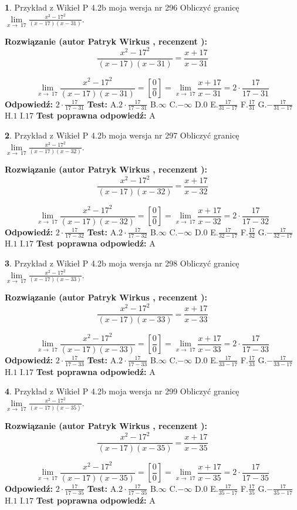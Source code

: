 \documentclass[12pt, a4paper]{article}
\theoremstyle{definition} %
\newtheorem{zad}{}
\newcommand{\zadStart}[1]{\begin{zad}#1\newline}
\newcommand{\zadStop}{\end{zad}}
\newcommand{\rozwStart}[2]{\noindent \textbf{Rozwiązanie (autor #1 , recenzent #2): }\newline}
\newcommand{\rozwStop}{\newline}
\newcommand{\odpStart}{\noindent \textbf{Odpowiedź:}\newline}
\newcommand{\odpStop}{\newline}
\newcommand{\testStart}{\noindent \textbf{Test:}\newline}
\newcommand{\testStop}{\newline}
\newcommand{\kluczStart}{\noindent \textbf{Test poprawna odpowiedź:}\newline}
\newcommand{\kluczStop}{\newline}
\begin{document}
\zadStart{Przykład z Wikieł P 4.2b moja wersja nr 296}
Obliczyć granicę $\lim\limits_{x\to\ 17}\frac{x^{2}-17^{2}}{(x-17)(x-31)}$.
\zadStop
\rozwStart{Patryk Wirkus}{}
$$\frac{x^{2}-17^{2}}{(x-17)(x-31)}=\frac{x+17}{x-31}$$

$$\lim\limits_{x\to\ 17}\frac{x^{2}-17^{2}}{(x-17)(x-31)}=[\frac{0}{0}]=\lim\limits_{x\to\ 17}\frac{x+17}{x-31}=2 \cdot \frac{17}{17-31}$$
\rozwStop
\odpStart
$2 \cdot \frac{17}{17-31}$
\odpStop
\testStart
A.$2 \cdot \frac{17}{17-31}$
B.$\infty$
C.$-\infty$
D.$0$
E.$\frac{17}{31-17}$
F.$\frac{17}{31}$
G.$-\frac{17}{31-17}$
H.$1$
I.$17$
\testStop
\kluczStart
A
\kluczStop



\zadStart{Przykład z Wikieł P 4.2b moja wersja nr 297}
Obliczyć granicę $\lim\limits_{x\to\ 17}\frac{x^{2}-17^{2}}{(x-17)(x-32)}$.
\zadStop
\rozwStart{Patryk Wirkus}{}
$$\frac{x^{2}-17^{2}}{(x-17)(x-32)}=\frac{x+17}{x-32}$$

$$\lim\limits_{x\to\ 17}\frac{x^{2}-17^{2}}{(x-17)(x-32)}=[\frac{0}{0}]=\lim\limits_{x\to\ 17}\frac{x+17}{x-32}=2 \cdot \frac{17}{17-32}$$
\rozwStop
\odpStart
$2 \cdot \frac{17}{17-32}$
\odpStop
\testStart
A.$2 \cdot \frac{17}{17-32}$
B.$\infty$
C.$-\infty$
D.$0$
E.$\frac{17}{32-17}$
F.$\frac{17}{32}$
G.$-\frac{17}{32-17}$
H.$1$
I.$17$
\testStop
\kluczStart
A
\kluczStop



\zadStart{Przykład z Wikieł P 4.2b moja wersja nr 298}
Obliczyć granicę $\lim\limits_{x\to\ 17}\frac{x^{2}-17^{2}}{(x-17)(x-33)}$.
\zadStop
\rozwStart{Patryk Wirkus}{}
$$\frac{x^{2}-17^{2}}{(x-17)(x-33)}=\frac{x+17}{x-33}$$

$$\lim\limits_{x\to\ 17}\frac{x^{2}-17^{2}}{(x-17)(x-33)}=[\frac{0}{0}]=\lim\limits_{x\to\ 17}\frac{x+17}{x-33}=2 \cdot \frac{17}{17-33}$$
\rozwStop
\odpStart
$2 \cdot \frac{17}{17-33}$
\odpStop
\testStart
A.$2 \cdot \frac{17}{17-33}$
B.$\infty$
C.$-\infty$
D.$0$
E.$\frac{17}{33-17}$
F.$\frac{17}{33}$
G.$-\frac{17}{33-17}$
H.$1$
I.$17$
\testStop
\kluczStart
A
\kluczStop



\zadStart{Przykład z Wikieł P 4.2b moja wersja nr 299}
Obliczyć granicę $\lim\limits_{x\to\ 17}\frac{x^{2}-17^{2}}{(x-17)(x-35)}$.
\zadStop
\rozwStart{Patryk Wirkus}{}
$$\frac{x^{2}-17^{2}}{(x-17)(x-35)}=\frac{x+17}{x-35}$$

$$\lim\limits_{x\to\ 17}\frac{x^{2}-17^{2}}{(x-17)(x-35)}=[\frac{0}{0}]=\lim\limits_{x\to\ 17}\frac{x+17}{x-35}=2 \cdot \frac{17}{17-35}$$
\rozwStop
\odpStart
$2 \cdot \frac{17}{17-35}$
\odpStop
\testStart
A.$2 \cdot \frac{17}{17-35}$
B.$\infty$
C.$-\infty$
D.$0$
E.$\frac{17}{35-17}$
F.$\frac{17}{35}$
G.$-\frac{17}{35-17}$
H.$1$
I.$17$
\testStop
\kluczStart
A
\kluczStop
\end{document}
